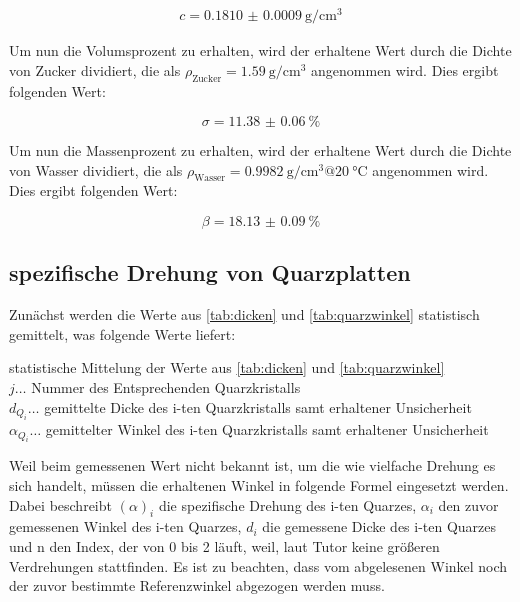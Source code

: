 \documentclass[11pt,ngerman]{scrartcl}
\begin{document}
\begin{align*}
	c = \SI{0.1810(9)}{\g\per\cm\cubed}
\end{align*}

Um nun die Volumsprozent zu erhalten, wird der erhaltene Wert durch die Dichte
von Zucker dividiert, die als $\rho_{\text{Zucker}} =
	\SI{1.59}{\g\per\cm\cubed}$ \cite{dichtezucker} angenommen wird. Dies ergibt
folgenden Wert:

\begin{equation*}
	\sigma = \SI{11.38(6)}{\percent}
	\label{eq:volumsprozent}
\end{equation*}


Um nun die Massenprozent zu erhalten, wird der erhaltene Wert durch die Dichte
von Wasser dividiert, die als $\rho_{\text{Wasser}} =
	\SI{0.9982}{\g\per\cm\cubed} @\SI{20}{\celsius}$ \cite{Kuchling} angenommen
wird. Dies ergibt folgenden Wert:

\begin{equation*}
	\beta = \SI{18.13(9)}{\percent}
	\label{eq:massenprozent}
\end{equation*}


\subsection{spezifische Drehung von Quarzplatten}

Zunächst werden die Werte aus \autoref{tab:dicken} und
\autoref{tab:quarzwinkel} statistisch gemittelt, was folgende Werte liefert:

\begin{table}[H]
	\caption{statistische Mittelung der Werte aus \autoref{tab:dicken} und
		\autoref{tab:quarzwinkel} \\ $j \dots$ Nummer des Entsprechenden
		Quarzkristalls \\ $d_{Q_i} \dots$ gemittelte Dicke des i-ten Quarzkristalls
		samt erhaltener Unsicherheit\\ $\alpha_{Q_i} \dots$ gemittelter Winkel des
		i-ten Quarzkristalls samt erhaltener Unsicherheit}
	\centering
	
	\label{tab:statistik}
\end{table}


Weil beim gemessenen Wert nicht bekannt ist, um die wie vielfache Drehung es
sich handelt, müssen die erhaltenen Winkel in folgende Formel eingesetzt
werden. Dabei beschreibt $(\alpha)_i$ die spezifische Drehung des i-ten
Quarzes, $\alpha_i$ den zuvor gemessenen Winkel des i-ten Quarzes, $d_i$ die
gemessene Dicke des i-ten Quarzes und n den Index, der von 0 bis 2 läuft, weil,
laut Tutor keine größeren Verdrehungen stattfinden. Es ist zu beachten, dass
vom abgelesenen Winkel noch der zuvor bestimmte Referenzwinkel abgezogen werden
muss.
\end{document}
